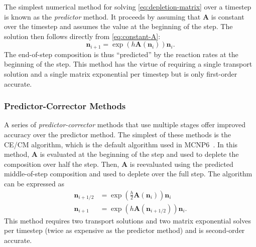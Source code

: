 \documentclass[3p,authoryear]{elsarticle}
\newcommand{\vect}[1]{\mathbf{#1}} %
\begin{document}
The simplest numerical method for solving \cref{eq:depletion-matrix} over a
timestep is known as the \emph{predictor} method. It proceeds by assuming that
$\vect{A}$ is constant over the timestep and assumes the value at the
beginning of the step. The solution then follows directly from
\cref{eq:constant-A}:
\begin{equation}
    \vect{n}_{i+1} = \exp\left(h\vect{A}(\vect{n}_i) \right) \vect{n}_i.
\end{equation}
The end-of-step composition is thus ``predicted'' by the reaction rates at the
beginning of the step. This method has the virtue of requiring a single
transport solution and a single matrix exponential per timestep but is only
first-order accurate.

\subsubsection{Predictor-Corrector Methods}

A series of \emph{predictor-corrector} methods that use multiple stages offer
improved accuracy over the predictor method. The simplest of these methods is
the CE/CM algorithm, which is the default algorithm used in
MCNP6~\citep{fensin2006tans}. In this method, $\vect{A}$ is evaluated at the
beginning of the step and used to deplete the composition over half the step.
Then, $\vect{A}$ is reevaluated using the predicted middle-of-step composition
and used to deplete over the full step. The algorithm can be expressed as
\begin{equation}
  \begin{split}
    \vect{n}_{i+1/2} &= \exp \left (\frac{h}{2}\vect{A}(\vect{n}_i) \right) \vect{n}_i \\
    \vect{n}_{i+1} &= \exp \left(h \vect{A}(\vect{n}_{i+1/2}) \right) \vect{n}_i.
  \end{split}
\end{equation}
This method requires two transport solutions and two matrix exponential solves
per timestep (twice as expensive as the predictor method) and is second-order
accurate.
\end{document}
